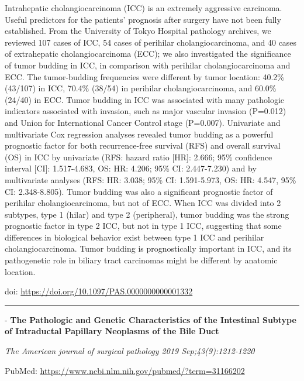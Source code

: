 \documentclass[
]{article}
\renewcommand{\linethickness}{0.05em}
\begin{document}
Intrahepatic cholangiocarcinoma (ICC) is an extremely aggressive
carcinoma. Useful predictors for the patients' prognosis after surgery
have not been fully established. From the University of Tokyo Hospital
pathology archives, we reviewed 107 cases of ICC, 54 cases of perihilar
cholangiocarcinoma, and 40 cases of extrahepatic cholangiocarcinoma
(ECC); we also investigated the significance of tumor budding in ICC, in
comparison with perihilar cholangiocarcinoma and ECC. The tumor-budding
frequencies were different by tumor location: 40.2\% (43/107) in ICC,
70.4\% (38/54) in perihilar cholangiocarcinoma, and 60.0\% (24/40) in
ECC. Tumor budding in ICC was associated with many pathologic indicators
associated with invasion, such as major vascular invasion (P=0.012) and
Union for International Cancer Control stage (P=0.007). Univariate and
multivariate Cox regression analyses revealed tumor budding as a
powerful prognostic factor for both recurrence-free survival (RFS) and
overall survival (OS) in ICC by univariate (RFS: hazard ratio {[}HR{]}:
2.666; 95\% confidence interval {[}CI{]}: 1.517-4.683, OS: HR: 4.206;
95\% CI: 2.447-7.230) and by multivariate analyses (RFS: HR: 3.038; 95\%
CI: 1.591-5.973, OS: HR: 4.547, 95\% CI: 2.348-8.805). Tumor budding was
also a significant prognostic factor of perihilar cholangiocarcinoma,
but not of ECC. When ICC was divided into 2 subtypes, type 1 (hilar) and
type 2 (peripheral), tumor budding was the strong prognostic factor in
type 2 ICC, but not in type 1 ICC, suggesting that some differences in
biological behavior exist between type 1 ICC and perihilar
cholangiocarcinoma. Tumor budding is prognostically important in ICC,
and its pathogenetic role in biliary tract carcinomas might be different
by anatomic location.

doi: \url{https://doi.org/10.1097/PAS.0000000000001332}

\begin{center}\rule{0.5\linewidth}{\linethickness}\end{center}

- \textbf{The Pathologic and Genetic Characteristics of the Intestinal
Subtype of Intraductal Papillary Neoplasms of the Bile Duct}

\emph{The American journal of surgical pathology 2019
Sep;43(9):1212-1220}

PubMed: \url{https://www.ncbi.nlm.nih.gov/pubmed/?term=31166202}
\end{document}
